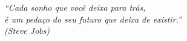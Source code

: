 \begin{epigrafe}
\vspace*{\fill}
\begin{flushright}
\textit{“Cada sonho que você deixa para trás,\\
é um pedaço do seu futuro que deixa de existir.”\\
(Steve Jobs)}
\end{flushright}
\end{epigrafe}
